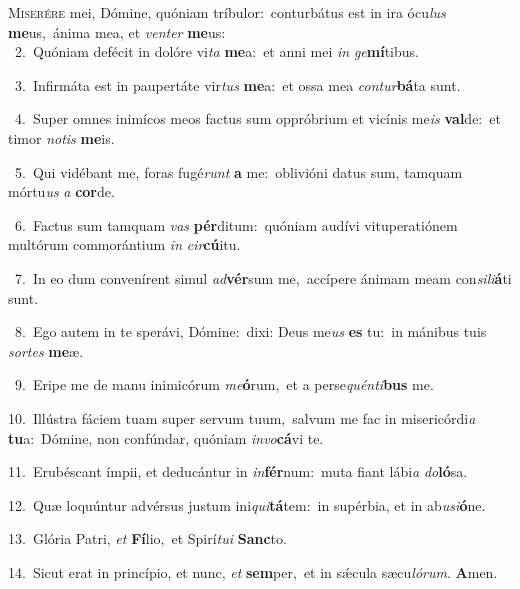 \lettrine{\initial\textcolor{\initialcolor}{M}}{iserére} mei, Dómine, quóniam tríbulor:~\dagger conturbátus est in ira ócu\textit{lus} \textbf{me}\-us,~\star ánima mea, et \textit{ven}\-\textit{ter} \textbf{me}\-us:\\
{\numbfont\textcolor{\numbcolor}{~2.}}~Quóniam defécit in dolóre vi\textit{ta} \textbf{me}\-a:~\star et anni mei \textit{in} \textit{ge}\-\textbf{mí}tibus.\par
{\numbfont\textcolor{\numbcolor}{~3.}}~Infirmáta est in paupertáte vir\textit{tus} \textbf{me}\-a:~\star et ossa mea \textit{con}\-\textit{tur}\textbf{bá}ta sunt.\par
{\numbfont\textcolor{\numbcolor}{~4.}}~Super omnes inimícos meos factus sum oppróbrium et vicínis me\textit{is} \textbf{val}\-de:~\star et timor \textit{no}\-\textit{tis} \textbf{me}\-is.\par
{\numbfont\textcolor{\numbcolor}{~5.}}~Qui vidébant me, foras fugé\textit{runt} \textbf{a} me:~\star oblivióni datus sum, tamquam mórtu\textit{us} \textit{a} \textbf{cor}\-de.\par
{\numbfont\textcolor{\numbcolor}{~6.}}~Factus sum tamquam \textit{vas} \textbf{pér}\-ditum:~\star quóniam audívi vituperatiónem multórum commorántium \textit{in} \textit{cir}\-\textbf{cú}itu.\par
{\numbfont\textcolor{\numbcolor}{~7.}}~In eo dum convenírent simul \textit{ad}\-\textbf{vér}sum me,~\star accípere ánimam meam con\-\textit{si}\-\textit{li}\textbf{á}ti sunt.\par
{\numbfont\textcolor{\numbcolor}{~8.}}~Ego autem in te sperávi, Dómine:~\dagger dixi: Deus me\textit{us} \textbf{es} tu:~\star in mánibus tuis \textit{sor}\-\textit{tes} \textbf{me}\-æ.\par
{\numbfont\textcolor{\numbcolor}{~9.}}~Eripe me de manu inimicórum \textit{me}\-\textbf{ó}rum,~\star et a perse\-\textit{quén}\-\textit{ti}\textbf{bus} me.\par
{\numbfont\textcolor{\numbcolor}{10.}}~Illústra fáciem tuam super servum tuum,~\dagger salvum me fac in misericórdi\textit{a} \textbf{tu}\-a:~\star Dómine, non confúndar, quóniam \textit{in}\-\textit{vo}\textbf{cá}vi te.\par
{\numbfont\textcolor{\numbcolor}{11.}}~Erubéscant ímpii, et deducántur in \textit{in}\-\textbf{fér}num:~\star muta fiant lábi\textit{a} \textit{do}\-\textbf{ló}sa.\par
{\numbfont\textcolor{\numbcolor}{12.}}~Quæ loquúntur advérsus justum ini\-\textit{qui}\-\textbf{tá}tem:~\star in supérbia, et in ab\-\textit{u}\-\textit{si}\textbf{ó}ne.\par
{\numbfont\textcolor{\numbcolor}{13.}}~Glória Patri, \textit{et} \textbf{Fí}\-lio,~\star et Spirí\-\textit{tu}\-\textit{i} \textbf{Sanc}\-to.\par
{\numbfont\textcolor{\numbcolor}{14.}}~Sicut erat in princípio, et nunc, \textit{et} \textbf{sem}\-per,~\star et in sǽcula sæcu\-\textit{ló}\-\textit{rum}. \textbf{A}\-men.\par
